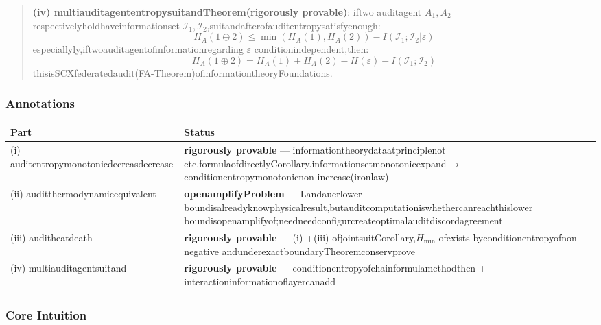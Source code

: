 \documentclass[
  12pt,
]{article}
\begin{document}
\begin{quote}
\textbf{(iv) multiauditagententropysuitandTheorem(rigorously provable)}: iftwo auditagent \(A_1, A_2\)
respectivelyholdhaveinformationset \(\mathcal{I}_1, \mathcal{I}_2\),suitandafterofauditentropysatisfyenough:
\[H_A(1 \oplus 2) \leq \min(H_A(1), H_A(2)) - I(\mathcal{I}_1; \mathcal{I}_2 | \varepsilon)\]
especiallyly,iftwoauditagentofinformationregarding \(\varepsilon\) conditionindependent,then:
\[H_A(1 \oplus 2) = H_A(1) + H_A(2) - H(\varepsilon) - I(\mathcal{I}_1; \mathcal{I}_2)\]
thisisSCXfederatedaudit(FA-Theorem)ofinformationtheoryFoundations.
\end{quote}

\subsubsection{Annotations}\label{ux6807ux6ce8-1}

\begin{longtable}[]{@{}
  >{\raggedright\arraybackslash}p{}
  >{\raggedright\arraybackslash}p{}@{}}
\toprule\noalign{}
\begin{minipage}[b]{\linewidth}\raggedright
Part
\end{minipage} & \begin{minipage}[b]{\linewidth}\raggedright
Status
\end{minipage} \\
\midrule\noalign{}
\endhead
\bottomrule\noalign{}
\endlastfoot
(i) auditentropymonotonicdecreasdecrease & \textbf{rigorously provable} ---
informationtheorydataatprinciplenot etc.formulaofdirectlyCorollary.informationsetmonotonicexpand  →
conditionentropymonotonicnon-increase(ironlaw) \\
(ii) auditthermodynamicequivalent & \textbf{openamplifyProblem} ---
Landauerlower boundisalreadyknowphysicalresult,butauditcomputationiswhethercanreachthislower boundisopenamplifyof;needneedconfigurcreateoptimalauditdiscordagreement \\
(iii) auditheatdeath & \textbf{rigorously provable} --- (i) +(iii)
ofjointsuitCorollary,\(H_{\min}\) ofexists byconditionentropyofnon-negative andunderexactboundaryTheoremconservprove \\
(iv) multiauditagentsuitand & \textbf{rigorously provable} --- conditionentropyofchainformulamethodthen +
interactioninformationoflayercanadd  \\
\end{longtable}

\subsubsection{Core Intuition}\label{ux6838ux5fc3ux76f4ux89c9-1}
\end{document}
